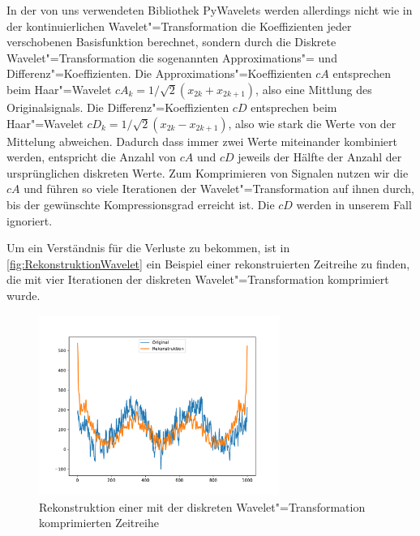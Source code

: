 In der von uns verwendeten Bibliothek PyWavelets \cite{pyWavelets} werden allerdings nicht wie in der kontinuierlichen Wavelet"=Transformation die Koeffizienten jeder verschobenen Basisfunktion berechnet, sondern durch die Diskrete Wavelet"=Transformation die sogenannten Approximations"= und Differenz"=Koeffizienten. Die Approximations"=Koeffizienten $cA$ entsprechen beim Haar"=Wavelet $cA_k = 1/\sqrt{2}(x_{2k} + x_{2k+1})$, also eine Mittlung des Originalsignals. Die Differenz"=Koeffizienten $cD$ entsprechen beim Haar"=Wavelet $cD_k = 1/\sqrt{2}(x_{2k}-x_{2k+1})$, also wie stark die Werte von der Mittelung abweichen. Dadurch dass immer zwei Werte miteinander kombiniert werden, entspricht die Anzahl von $cA$ und $cD$ jeweils der Hälfte der Anzahl der ursprünglichen diskreten Werte. Zum Komprimieren von Signalen nutzen wir die $cA$ und führen so viele Iterationen der Wavelet"=Transformation auf ihnen durch, bis der gewünschte Kompressionsgrad erreicht ist. Die $cD$ werden in unserem Fall ignoriert.

Um ein Verständnis für die Verluste zu bekommen, ist in \autoref{fig:RekonstruktionWavelet} ein Beispiel einer rekonstruierten Zeitreihe zu finden, die mit vier Iterationen der diskreten Wavelet"=Transformation komprimiert wurde.
\begin{figure}[bth] 
  \centering
  \includegraphics[width=0.7\textwidth]{Graphics/RekonstruktionFourier.pdf}
  \caption{Rekonstruktion einer mit der diskreten Wavelet"=Transformation komprimierten Zeitreihe}
  \label{fig:RekonstruktionWavelet}
\end{figure}